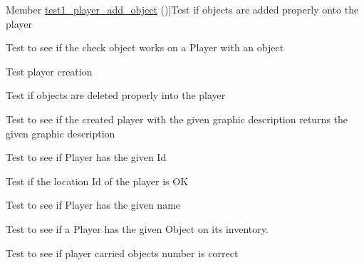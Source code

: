 \begin{DoxyRefList}
\hypertarget{test__test000189}{}%
Member \hyperlink{player__test_8h_a14a3e4867e2ad3287c8efa99cd36904e}{test1\+\_\+player\+\_\+add\+\_\+object} ()]Test if objects are added properly onto the player  
\item[\label{test__test000201}%
\hypertarget{test__test000201}{}%
Member \hyperlink{player__test_8h_a95396b550249d790fe55be1e553517ae}{test1\+\_\+player\+\_\+check\+\_\+object} ()]Test to see if the check object works on a Player with an object  
\item[\label{test__test000164}%
\hypertarget{test__test000164}{}%
Member \hyperlink{player__test_8h_ab29768452373e16bb6aaa1f7998f62fb}{test1\+\_\+player\+\_\+create} ()]Test player creation  
\item[\label{test__test000191}%
\hypertarget{test__test000191}{}%
Member \hyperlink{player__test_8h_ab8680555a9d30950ffa0547011a0f787}{test1\+\_\+player\+\_\+del\+\_\+object} ()]Test if objects are deleted properly into the player  
\item[\label{test__test000179}%
\hypertarget{test__test000179}{}%
Member \hyperlink{player__test_8h_a07beea3b974453e5d8001d04e6db5ac4}{test1\+\_\+player\+\_\+get\+\_\+graphic\+\_\+description} ()]Test to see if the created player with the given graphic description returns the given graphic description  
\item[\label{test__test000177}%
\hypertarget{test__test000177}{}%
Member \hyperlink{player__test_8h_a790a75dc179c00c60c784d3e34c0e5aa}{test1\+\_\+player\+\_\+get\+\_\+id} ()]Test to see if Player has the given Id  
\item[\label{test__test000187}%
\hypertarget{test__test000187}{}%
Member \hyperlink{player__test_8h_a408a557a0cff748c10fb9a03445af191}{test1\+\_\+player\+\_\+get\+\_\+location} ()]Test if the location Id of the player is OK  
\item[\label{test__test000175}%
\hypertarget{test__test000175}{}%
Member \hyperlink{player__test_8h_a94068667d8faa66a4ad293dd2c60f2ef}{test1\+\_\+player\+\_\+get\+\_\+name} ()]Test to see if Player has the given name  
\item[\label{test__test000181}%
\hypertarget{test__test000181}{}%
Member \hyperlink{player__test_8h_a53eb6ee101f01fe988c5da03129d2e2f}{test1\+\_\+player\+\_\+get\+\_\+object} ()]Test to see if a Player has the given Object on its inventory.  
\item[\label{test__test000183}%
\hypertarget{test__test000183}{}%
Member \hyperlink{player__test_8h_af1b1a4517ec347b3b953c9fc9b3ea1a5}{test1\+\_\+player\+\_\+get\+\_\+objects\+\_\+number} ()]Test to see if player carried objects number is correct  

\end{DoxyRefList}
